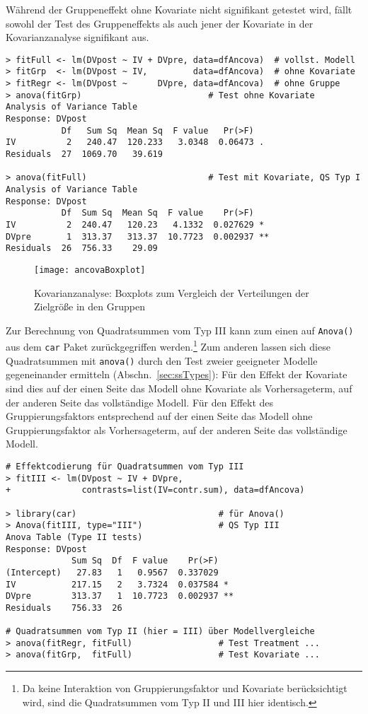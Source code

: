 Während der Gruppeneffekt ohne Kovariate nicht signifikant getestet wird, fällt sowohl der Test des Gruppeneffekts als auch jener der Kovariate in der Kovarianzanalyse signifikant aus. 
\begin{lstlisting}
> fitFull <- lm(DVpost ~ IV + DVpre, data=dfAncova)  # vollst. Modell
> fitGrp  <- lm(DVpost ~ IV,         data=dfAncova)  # ohne Kovariate
> fitRegr <- lm(DVpost ~      DVpre, data=dfAncova)  # ohne Gruppe
> anova(fitGrp)                         # Test ohne Kovariate
Analysis of Variance Table
Response: DVpost
           Df   Sum Sq  Mean Sq  F value   Pr(>F)
IV          2   240.47  120.233   3.0348  0.06473 .
Residuals  27  1069.70   39.619

> anova(fitFull)                        # Test mit Kovariate, QS Typ I
Analysis of Variance Table
Response: DVpost
           Df  Sum Sq  Mean Sq  F value    Pr(>F)
IV          2  240.47   120.23   4.1332  0.027629 *
DVpre       1  313.37   313.37  10.7723  0.002937 **
Residuals  26  756.33    29.09
\end{lstlisting}

\begin{figure}[ht]
\centering
\texttt{[image: ancovaBoxplot]}
\vspace*{-1em}
\caption{Kovarianzanalyse: Boxplots zum Vergleich der Verteilungen der Zielgröße in den Gruppen}
\label{fig:ancovaBoxplot}
\end{figure}

Zur Berechnung von Quadratsummen vom Typ III kann zum einen auf \lstinline!Anova()! aus dem \lstinline!car! Paket zurückgegriffen werden.\footnote{Da keine Interaktion von Gruppierungsfaktor und Kovariate berücksichtigt wird, sind die Quadratsummen vom Typ II und III hier identisch.} Zum anderen lassen sich diese Quadratsummen mit \lstinline!anova()! durch den Test zweier geeigneter Modelle gegeneinander ermitteln (Abschn.\ \ref{sec:ssTypes}): Für den Effekt der Kovariate sind dies auf der einen Seite das Modell ohne Kovariate als Vorhersageterm, auf der anderen Seite das vollständige Modell. Für den Effekt des Gruppierungsfaktors entsprechend auf der einen Seite das Modell ohne Gruppierungsfaktor als Vorhersageterm, auf der anderen Seite das vollständige Modell.
\begin{lstlisting}
# Effektcodierung für Quadratsummen vom Typ III
> fitIII <- lm(DVpost ~ IV + DVpre,
+              contrasts=list(IV=contr.sum), data=dfAncova)

> library(car)                            # für Anova()
> Anova(fitIII, type="III")               # QS Typ III
Anova Table (Type II tests)
Response: DVpost
             Sum Sq  Df  F value    Pr(>F)
(Intercept)   27.83   1   0.9567  0.337029
IV           217.15   2   3.7324  0.037584 *
DVpre        313.37   1  10.7723  0.002937 **
Residuals    756.33  26

# Quadratsummen vom Typ II (hier = III) über Modellvergleiche
> anova(fitRegr, fitFull)                 # Test Treatment ...
> anova(fitGrp,  fitFull)                 # Test Kovariate ...
\end{lstlisting}

